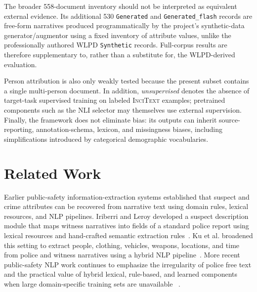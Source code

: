 \documentclass[sigconf,nonacm]{acmart}
\newcommand{\incitext}{\textsc{InciText}}
\begin{document}
The broader 558-document inventory should not be interpreted as equivalent
external evidence. Its additional 530 \texttt{Generated} and
\texttt{Generated\_flash} records are free-form narratives produced
programmatically by the project's synthetic-data generator/augmentor using a
fixed inventory of attribute values, unlike the professionally authored WLPD
\texttt{Synthetic} records. Full-corpus results are therefore supplementary to,
rather than a substitute for, the WLPD-derived evaluation.

Person attribution is also only weakly tested because the present subset
contains a single multi-person document.
In addition, \emph{unsupervised} denotes the absence of target-task supervised
training on labeled \incitext{} examples; pretrained components such as the NLI
selector may themselves use external supervision. Finally, the framework does
not eliminate bias: its outputs can inherit source-reporting, annotation-schema,
lexicon, and missingness biases, including simplifications introduced by
categorical demographic vocabularies.

\section{Related Work}
\label{sec:related}

Earlier public-safety information-extraction systems established that suspect
and crime attributes can be recovered from narrative text using domain rules,
lexical resources, and NLP pipelines. Iriberri and Leroy developed a suspect
description module that maps witness narratives into fields of a standard
police report using lexical resources and hand-crafted semantic extraction
rules~\cite{iriberri2007crime}. Ku et al. broadened this setting to extract
people, clothing, vehicles, weapons, locations, and time from police and
witness narratives using a hybrid NLP pipeline~\cite{ku2008crimeie}. More
recent public-safety NLP work continues to emphasize the irregularity of police
free text and the practical value of hybrid lexical, rule-based, and learned
components when large domain-specific training sets are unavailable
~\cite{dixon2021policing,skorzewski2022criminal}.
\end{document}
